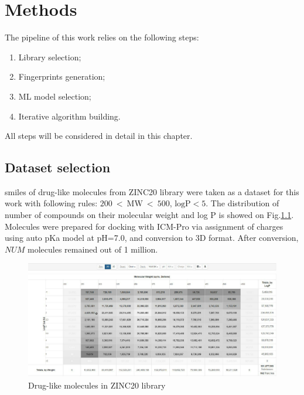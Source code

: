\chapter{Methods}


The pipeline of this work relies on the following steps:
\begin{enumerate}
    \item Library selection;
    \item Fingerprints generation;
    \item ML model selection;
    \item Iterative algorithm building.
\end{enumerate}
All steps will be considered in detail in this chapter.
\section{Dataset selection}

\acrshort{smiles} of drug-like molecules from ZINC20 library were taken as a dataset for this work with following rules: $200\ <\ \text{MW}\ <\ 500$, $\text{logP} < 5$.
The distribution of number of compounds on their molecular weight and log P is showed 
on  Fig.\ref{zinc}.\\

Molecules were prepared for docking with ICM-Pro via assignment of charges using auto pKa model at pH=7.0, and conversion to 3D format. 
After conversion, $NUM$ molecules remained out of 1 million.

\begin{figure}[H]
    \centering
    \includegraphics[scale=0.35]{Images/zinc.jpg}
    \caption{Drug-like molecules in ZINC20 library}
   \label{zinc}
\end{figure}

